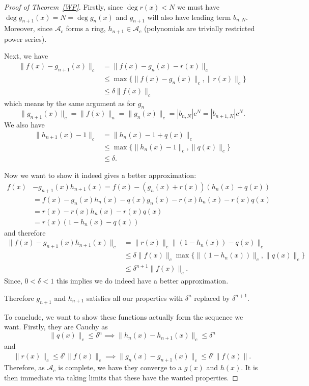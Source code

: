 \begin{proof}[Proof of Theorem~\ref{WP}]
    Firstly, since $\deg r(x) < N$ we must have $\deg g_{n+1} (x) = N = \deg g_n (x)$ and
    $g_{n+1}$ will also have leading term $b_{n,N}$.
    Moreover, since $\mathcal{A}_c$ forms a ring, $h_{n+1} \in \mathcal{A}_c$ (polynomials are
    trivially restricted power series).

    Next, we have
    \begin{align*}
        \| f(x) - g_{n+1}(x) \|_c &= \| f(x) - g_n (x) - r(x) \|_c \\
        & \leq \max \{ \|f(x) - g_n(x) \|_c, \| r(x) \|_c \} \\
        & \leq \delta \| f(x) \|_c
    \end{align*}
    which means by the same argument as for $g_n$
    \[
    \|g_{n+1} (x)\|_c = \| f(x) \|_n = \| g_n ( x) \|_c = |b_{n,N}| c^N = | b_{n+1,N} | c^N.
    \]
    We also have
    \begin{align*}
        \| h_{n+1} (x) - 1 \|_c & = \| h_n (x) - 1 + q(x) \|_c \\
        & \leq \max \{ \| h_n (x) - 1 \|_c , \| q(x) \|_c \} \\
        & \leq \delta .
    \end{align*}

    Now we want to show it indeed gives a better approximation:
    \begin{align*}
        f(x) &- g_{n+1} (x) h_{n+1}(x) = f(x) - (g_n (x) + r(x) ) (h_n(x) + q(x)) \\
        &= f(x) - g_n (x) h_n (x) - q(x) g_n(x) - r(x) h_n (x) - r(x) q(x) \\
        & = r(x) - r(x) h_n (x) - r(x) q(x) \\
        & = r(x) ( 1 - h_n (x) - q(x) )
    \end{align*}
    and therefore
    \begin{align*}
    \| f(x) - g_{n+1} (x) h_{n+1} (x) \|_c &= \| r(x) \|_c \|(1 - h_n(x)) - q(x) \|_c \\
    & \leq \delta \|f(x) \|_c \max\{ \|(1 - h_n (x)) \|_c, \|q(x)\|_c \} \\
    & \leq \delta^{n+1} \|f(x) \|_c.
    \end{align*}
    Since, $0 < \delta < 1$ this implies we do indeed have a better approximation.

    Therefore $g_{n+1}$ and $h_{n+1}$ satisfies all our properties with $\delta^n$ replaced by
    $\delta^{n+1}$.

    To conclude, we want to show these functions actually form the sequence we want.
    Firstly, they are Cauchy as
    \[
    \| q(x) \|_c \leq \delta^n \implies \|h_n (x) - h_{n+1}  (x) \|_c \leq \delta^n
    \]
    and
    \[
    \| r(x) \|_c \leq \delta^i \|f(x) \|_c \implies
    \|g_n (x) - g_{n+1} (x) \|_c \leq \delta^i \| f(x) \|.
    \]
    Therefore, as $\mathcal{A}_c$ is complete, we have they converge to a $g(x)$ and $h(x)$. It is
    then immediate via taking limits that these have the wanted properties.
\end{proof}

